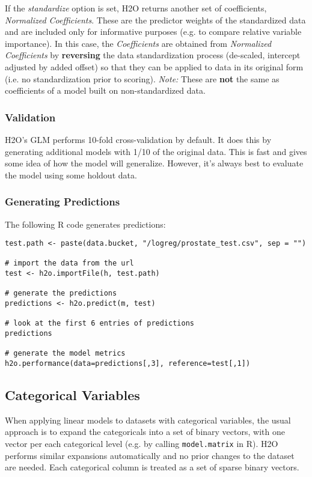 \documentclass[11pt]{article}
\begin{document}
If the \textit{standardize} option is set, H2O returns another set of coefficients, \textit{Normalized Coefficients}. These are the predictor weights of the standardized data and are included only for informative purposes (e.g. to compare relative variable importance). In this case, the \textit{Coefficients} are obtained from \textit{Normalized Coefficients} by \textbf{reversing} the data standardization process (de-scaled, intercept adjusted by added offset) so that they can be applied to data in its original form (i.e. no standardization prior to scoring). \textit{Note:} These are \textbf{not} the same as coefficients of a model built on non-standardized data.

\subsubsection{Validation}

H2O's GLM performs 10-fold cross-validation by default. It does this by generating additional models with 1/10 of the original data. This is fast and gives some idea of how the model will generalize. However, it's always best to evaluate the model using some holdout data.

\subsubsection{Generating Predictions}

The following R code generates predictions:

\begin{verbatim}
test.path <- paste(data.bucket, "/logreg/prostate_test.csv", sep = "")

# import the data from the url
test <- h2o.importFile(h, test.path)

# generate the predictions
predictions <- h2o.predict(m, test)

# look at the first 6 entries of predictions
predictions

# generate the model metrics
h2o.performance(data=predictions[,3], reference=test[,1])
\end{verbatim}


\subsection{Categorical Variables}
When applying linear models to datasets with categorical variables, the usual approach is to expand the categoricals into a set of binary vectors, with one vector per each categorical level (e.g. by calling {\texttt{model.matrix}} in R). H2O performs similar expansions automatically and no prior changes to the dataset are needed. Each categorical column is treated as a set of sparse binary vectors.
\end{document}
